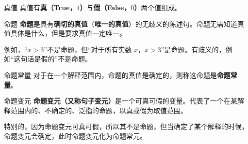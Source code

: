 
\begin{definition}{真值}
真值有\textbf{真（True，$1$）}与\textbf{假（False，$0$）}两个值组成。
\end{definition}

\begin{definition}{命题}
\textbf{命题}是具有\textbf{确切的真值}（\textbf{唯一的真值}）的无歧义的陈述句。命题无需知道真值具体是什么，但是要求真值一定唯一。
\end{definition}
例如，“$x>3$”不是命题，但“对于所有实数 $x$，$x>3$”是命题。有歧义的，例如“这句话是假的”不是命题。



\begin{definition}{命题常量}
对于在一个解释范围内，命题的真值是确定的，则称这命题是\textbf{命题常量}。
\end{definition}
\begin{definition}{命题变元}
\textbf{命题变元（又称句子变元）}是一个可真可假的变量。代表了一个在某解释范围内的、不确定的、泛指的命题，以真或假为取值范围。
\end{definition}
特别的，因为命题变元可真可假，所以其不是命题，但当确定了某个解释的时候，命题变元会确定，此时命题变元化为命题常元。


